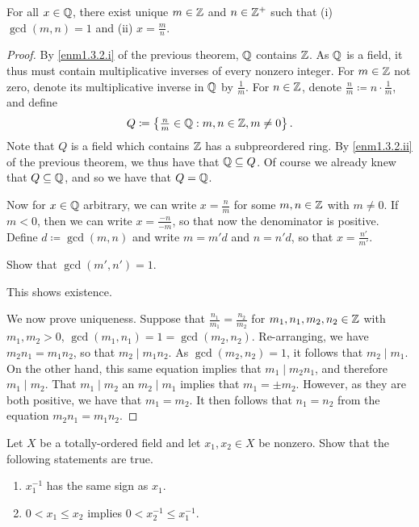 \begin{prp}\label{prp1.3.4}
For all $x\in \mathbb{Q}$, there exist unique $m\in \mathbb{Z}$ and $n\in \mathbb{Z}^+$ such that (i) $\gcd (m,n)=1$ and (ii) $x=\frac{m}{n}$.
\begin{proof}
By \ref{enm1.3.2.i} of the previous theorem, $\mathbb{Q}$ contains $\mathbb{Z}$.  As $\mathbb{Q}$ is a field, it thus must contain multiplicative inverses of every nonzero integer.  For $m\in \mathbb{Z}$ not zero, denote its multiplicative inverse in $\mathbb{Q}$ by $\frac{1}{m}$.  For $n\in \mathbb{Z}$, denote $\frac{n}{m}\coloneqq n\cdot \frac{1}{m}$, and define
\begin{equation}
Q\coloneqq \left\{ \tfrac{n}{m}\in \mathbb{Q} :m,n\in \mathbb{Z} ,m\neq 0\right\} .
\end{equation}
Note that $Q$ is a field which contains $\mathbb{Z}$ has a subpreordered ring.  By \ref{enm1.3.2.ii} of the previous theorem, we thus have that $\mathbb{Q} \subseteq Q$.  Of course we already knew that $Q\subseteq \mathbb{Q}$, and so we have that $Q=\mathbb{Q}$.

Now for $x\in \mathbb{Q}$ arbitrary, we can write $x=\frac{n}{m}$ for some $m,n\in \mathbb{Z}$ with $m\neq 0$.  If $m<0$, then we can write $x=\frac{-n}{-m}$, so that now the denominator is positive.  Define $d\coloneqq \gcd (m,n)$ and write $m=m'd$ and $n=n'd$, so that $x=\frac{n'}{m'}$.
\begin{exr}
Show that $\gcd (m',n')=1$.
\end{exr}
This shows existence.

We now prove uniqueness.  Suppose that $\frac{n_1}{m_1}=\frac{n_2}{m_2}$ for $m_1,n_1,m_2,n_2\in \mathbb{Z}$ with $m_1,m_2>0$, $\gcd (m_1,n_1)=1=\gcd (m_2,n_2)$.  Re-arranging, we have $m_2n_1=m_1n_2$, so that $m_2\mid m_1n_2$.  As $\gcd (m_2,n_2)=1$, it follows that $m_2\mid m_1$.  On the other hand, this same equation implies that $m_1\mid m_2n_1$, and therefore $m_1\mid m_2$.  That $m_1\mid m_2$ an $m_2\mid m_1$ implies that $m_1=\pm m_2$.  However, as they are both positive, we have that $m_1=m_2$.  It then follows that $n_1=n_2$ from the equation $m_2n_1=m_1n_2$.
\end{proof}
\end{prp}
\begin{exr}
Let $X$ be a totally-ordered field and let $x_1,x_2\in X$ be nonzero.  Show that the following statements are true.
\begin{enumerate}
\item $x_1^{-1}$ has the same sign as $x_1$.
\item $0<x_1\leq x_2$ implies $0<x_2^{-1}\leq x_1^{-1}$.
\end{enumerate}
\end{exr}

